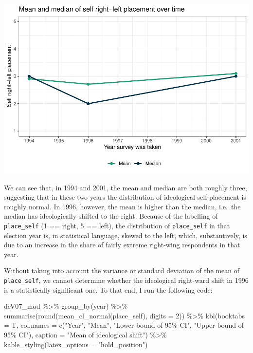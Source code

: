 \documentclass[
]{article}
\newenvironment{Shaded}{\begin{snugshade}}{\end{snugshade}}
\newcommand{\AttributeTok}[1]{\textcolor[rgb]{0.77,0.63,0.00}{#1}}
\newcommand{\DecValTok}[1]{\textcolor[rgb]{0.00,0.00,0.81}{#1}}
\newcommand{\FunctionTok}[1]{\textcolor[rgb]{0.00,0.00,0.00}{#1}}
\newcommand{\NormalTok}[1]{#1}
\newcommand{\SpecialCharTok}[1]{\textcolor[rgb]{0.00,0.00,0.00}{#1}}
\newcommand{\StringTok}[1]{\textcolor[rgb]{0.31,0.60,0.02}{#1}}
\begin{document}
\includegraphics{AVCD-Assignment2-Edenhofer_files/figure-latex/mean-self-rl-over-time-1.pdf}

We can see that, in 1994 and 2001, the mean and median are both roughly
three, suggesting that in these two years the distribution of
ideological self-placement is roughly normal. In 1996, however, the mean
is higher than the median, i.e.~the median has ideologically shifted to
the right. Because of the labelling of \texttt{place\_self} (1 == right,
5 == left), the distribution of \texttt{place\_self} in that election
year is, in statistical language, skewed to the left, which,
substantively, is due to an increase in the share of fairly extreme
right-wing respondents in that year.

Without taking into account the variance or standard deviation of the
mean of \texttt{place\_self}, we cannot determine whether the
ideological right-ward shift in 1996 is a statistically significant one.
To that end, I run the following code:

\begin{Shaded}
\begin{Highlighting}[]
\NormalTok{deV07\_mod }\SpecialCharTok{\%\textgreater{}\%}
  \FunctionTok{group\_by}\NormalTok{(year) }\SpecialCharTok{\%\textgreater{}\%}
  \FunctionTok{summarise}\NormalTok{(}\FunctionTok{round}\NormalTok{(}\FunctionTok{mean\_cl\_normal}\NormalTok{(place\_self), }\AttributeTok{digits =} \DecValTok{2}\NormalTok{)) }\SpecialCharTok{\%\textgreater{}\%}
  \FunctionTok{kbl}\NormalTok{(}\AttributeTok{booktabs =}\NormalTok{ T, }
      \AttributeTok{col.names =} \FunctionTok{c}\NormalTok{(}\StringTok{"Year"}\NormalTok{, }\StringTok{"Mean"}\NormalTok{, }\StringTok{"Lower bound of 95\% CI"}\NormalTok{,}
                      \StringTok{"Upper bound of 95\% CI"}\NormalTok{), }
      \AttributeTok{caption =} \StringTok{"Mean of ideological shift"}\NormalTok{) }\SpecialCharTok{\%\textgreater{}\%}
  \FunctionTok{kable\_styling}\NormalTok{(}\AttributeTok{latex\_options =} \StringTok{"hold\_position"}\NormalTok{)}
\end{Highlighting}
\end{Shaded}
\end{document}
